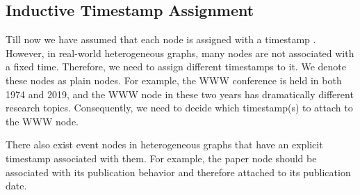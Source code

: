 \documentclass[sigconf]{acmart}
\theoremstyle{definition}
\begin{document}
\subsection{ Inductive Timestamp Assignment}

Till now we have assumed that each node  is assigned with a timestamp . However, in real-world heterogeneous graphs, many nodes are not associated with a fixed time. Therefore, we need to assign different timestamps to it. We denote these nodes as {plain nodes}. For example, the WWW conference is held in both 1974 and 2019, and the WWW node in these two years has dramatically different research topics. Consequently, we need to decide which timestamp(s) to attach to the WWW node. 

There also exist {event nodes} in heterogeneous graphs that have an explicit timestamp associated with them. 
For example, the paper node should be associated with its publication behavior and therefore attached to its publication date. 
\end{document}
